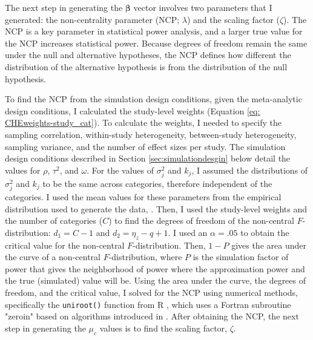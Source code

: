 The next step in generating the $\bm{\beta}$ vector involves two parameters that I generated: the non-centrality parameter (NCP; $\lambda$) and the scaling factor ($\zeta$). The NCP is a key parameter in statistical power analysis, and a larger true value for the NCP increases statistical power. Because degrees of freedom remain the same under the null and alternative hypotheses, the NCP defines how different the distribution of the alternative hypothesis is from the distribution of the null hypothesis. 

To find the NCP from the simulation design conditions, given the meta-analytic design conditions, I calculated the study-level weights (Equation \ref{eq: CHEweights-study_cat}). To calculate the weights, I needed to specify the sampling correlation, within-study heterogeneity, between-study heterogeneity, sampling variance, and the number of effect sizes per study. The simulation design conditions described in Section \ref{sec:simulationdesgin} below detail the values for $\rho$, $\tau^2$, and $\omega$. For the values of $\sigma_j^2$ and $k_j$, I assumed the distributions of $\sigma_j^2$ and $k_j$ to be the same across categories, therefore independent of the categories. I used the mean values for these parameters from the empirical distribution used to generate the data, \textcite{WilliamsRyan2022HiMI}. Then, I used the study-level weights and the number of categories ($C$) to find the degrees of freedom of the non-central $F$-distribution: $d_1 = C-1$ and $d_2 = \eta_z - q + 1$. I used an $\alpha=.05$ to obtain the critical value for the non-central $F$-distribution. Then, $1-P$ gives the area under the curve of a non-central $F$-distribution, where $P$ is the simulation factor of power that gives the neighborhood of power where the approximation power and the true (simulated) value will be. Using the area under the curve, the degrees of freedom, and the critical value, I solved for the NCP using numerical methods, specifically the \texttt{uniroot()} function from R \autocite{R}, which uses a Fortran subroutine "zeroin" based on algorithms introduced in \textcite{brent2013}. After obtaining the NCP, the next step in generating the $\mu_c$ values is to find the scaling factor, $\zeta$.

